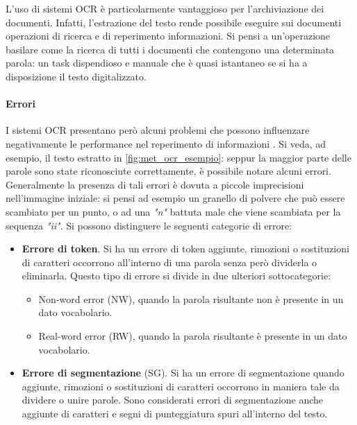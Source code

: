 L'uso di sistemi OCR è particolarmente vantaggioso per l'archiviazione dei documenti. Infatti, l'estrazione del testo rende possibile eseguire sui documenti operazioni di ricerca e di reperimento informazioni. Si pensi a un'operazione basilare come la ricerca di tutti i documenti che contengono una determinata parola: un task dispendioso e manuale che è quasi istantaneo se si ha a disposizione il testo digitalizzato.
\paragraph{Errori}
I sistemi OCR presentano però alcuni problemi che possono influenzare negativamente le performance nel reperimento di informazioni \cite{impatto_ocr_1}\cite{impatto_ocr_2}. Si veda, ad esempio, il testo estratto in \autoref{fig:met_ocr_esempio}: seppur la maggior parte delle parole sono state riconosciute correttamente, è possibile notare alcuni errori. 
Generalmente la presenza di tali errori è dovuta a piccole imprecisioni nell'immagine iniziale: si pensi ad esempio un granello di polvere che può essere scambiato per un punto, o ad una \textit{"n"} battuta male che viene scambiata per la sequenza \textit{"ii"}. Si possono distinguere le seguenti categorie di errore:
\begin{itemize}
\item \textbf{Errore di token}. Si ha un errore di token aggiunte, rimozioni o sostituzioni di caratteri occorrono all'interno di una parola senza però dividerla o eliminarla. Questo tipo di errore si divide in due ulteriori sottocategorie:
	\begin{itemize}
	\item Non-word error (NW), quando la parola risultante non è presente in un dato vocabolario.
	\item Real-word error (RW), quando la parola risultante è presente in un dato vocabolario.
	\end{itemize}
	
\item \textbf{Errore di segmentazione} (SG). Si ha un errore di segmentazione quando aggiunte, rimozioni o sostituzioni di caratteri occorrono in maniera tale da dividere o unire parole. Sono considerati errori di segmentazione anche aggiunte di caratteri e segni di punteggiatura spuri all'interno del testo.
\end{itemize}


